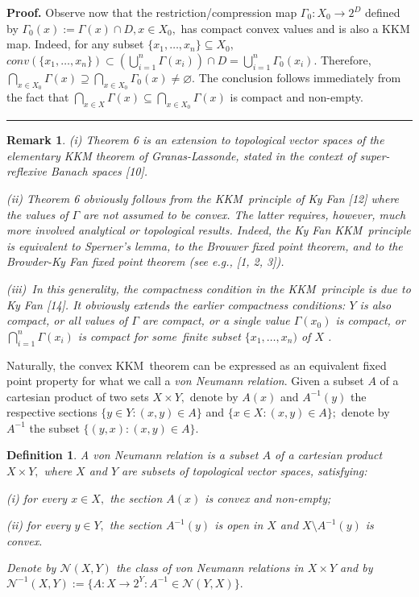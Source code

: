 \documentclass{article}
\newtheorem{definition}[theorem]{Definition}
\newtheorem{remark}[theorem]{Remark}
\newenvironment{proof}[1][Proof]{\noindent\textbf{#1.} }{\ \rule{0.5em}{0.5em}}
\begin{document}
\begin{proof}
Observe now that the restriction/compression map $\Gamma
_{0}:X_{0}\longrightarrow 2^{D}$ defined by $\Gamma _{0}(x):=\Gamma (x)\cap
D,x\in X_{0},$ has compact convex values and is also a KKM map. Indeed, for
any subset $\{x_{1},\ldots ,x_{n}\}\subseteq X_{0},$ $conv(\{x_{1},\ldots
,x_{n}\})\subset (\bigcup_{i=1}^{n}\Gamma (x_{i}))\cap
D=\bigcup_{i=1}^{n}\Gamma _{0}(x_{i}).$ Therefore, $\bigcap_{x\in
X_{0}}\Gamma (x)\supseteq \bigcap_{x\in X_{0}}\Gamma _{0}(x)\neq \varnothing
.$ The conclusion follows immediately from the fact that $\bigcap_{x\in
X}\Gamma (x)\subseteq \bigcap_{x\in X_{0}}\Gamma (x)$ is compact and
non-empty.
\end{proof}

\begin{remark}
(i) Theorem 6 is an extension to topological vector spaces of the elementary
KKM theorem of Granas-Lassonde, stated in the context of super-reflexive
Banach spaces [10].

(ii) Theorem 6 obviously follows from the KKM\ principle of Ky Fan [12]
where the values of $\Gamma $ are not assumed to be convex. The latter
requires, however, much more involved analytical or topological results.
Indeed, the Ky Fan KKM\ principle is equivalent to Sperner's lemma, to the
Brouwer fixed point theorem, and to the Browder-Ky Fan fixed point theorem
(see e.g., [1, 2, 3]).

(iii)\ In this generality, the compactness condition in the KKM\ principle
is due to Ky Fan [14]. It obviously extends the earlier compactness
conditions: $Y$ is also compact, or all values of $\Gamma $ are compact, or
a single value $\Gamma (x_{0})$ is compact, or $\bigcap_{i=1}^{n}\Gamma
(x_{i})$ is compact for some\ finite subset $\{x_{1},\ldots ,x_{n})$ of $X$%
.\bigskip
\end{remark}

Naturally, the convex KKM\ theorem can be expressed as an equivalent fixed
point property for what we call a \textit{von Neumann relation}. Given a
subset $A$ of a cartesian product of two sets $X\times Y,$ denote by $A(x)$
and $A^{-1}(y)$ the respective sections $\{y\in Y:(x,y)\in A\}$ and $\{x\in
X:(x,y)\in A\};$ denote by $A^{-1}$ the subset $\{(y,x):(x,y)\in A\}.$

\begin{definition}
A von Neumann relation is a subset $A$ of a cartesian product $X\times Y,$
where $X$ and $Y$ are subsets of topological vector spaces, satisfying:

(i) for every $x\in X,$ the section $A(x)$ is convex and non-empty;

(ii) for every $y\in Y,$ the section $A^{-1}(y)$ is open in $X$ and $%
X\setminus A^{-1}(y)$ is convex.

Denote by $\mathcal{N}(X,Y)$ the class of von Neumann relations in $X\times
Y $ and by $\mathcal{N}^{-1}(X,Y):=\{A:X\longrightarrow 2^{Y}:A^{-1}\in 
\mathcal{N}(Y,X)\}.$
\end{definition}
\end{document}
